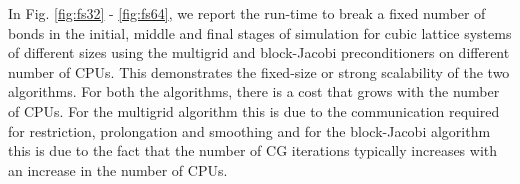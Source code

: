 \documentclass[11pt]{iopart}
\begin{document}
In Fig. \ref{fig:fs32} - \ref{fig:fs64}, we report the run-time to break a fixed 
 number of bonds in the initial, middle and final stages of simulation for cubic lattice
 systems of different sizes using the multigrid and block-Jacobi preconditioners on different
 number of CPUs. This demonstrates the fixed-size or strong scalability of the two algorithms.
 For both the algorithms, there is a cost that grows with the number of CPUs. For the multigrid
 algorithm this is due to the communication required for restriction, prolongation and smoothing and for
 the block-Jacobi algorithm this is due to the fact that the number of CG iterations typically increases with
 an increase in the number of CPUs.

\begin{figure}
\begin{center}
\subfigure[$L = 64$] { 
\label{fig:fs64} 
}
\end{center}
\end{figure}
\end{document}
